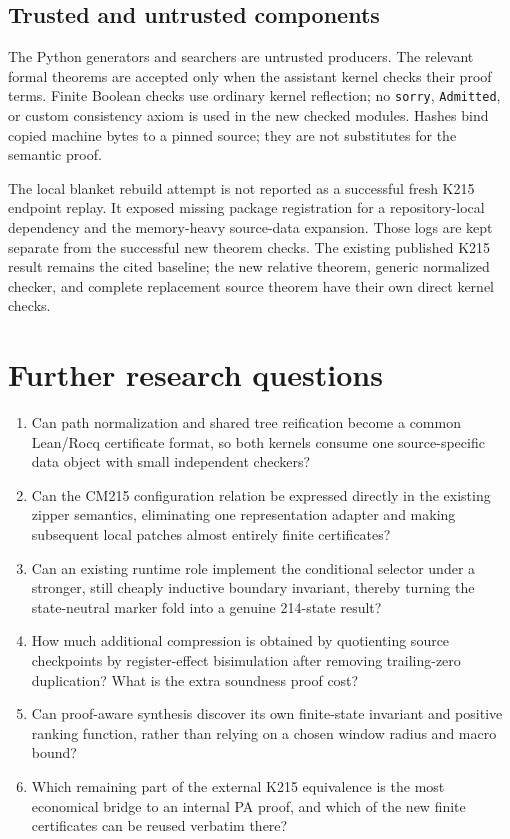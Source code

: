 \documentclass[11pt,letterpaper]{article}
\theoremstyle{definition}\newtheorem{definition}[theorem]{Definition}
\theoremstyle{remark}\newtheorem{remark}[theorem]{Remark}
\begin{document}
\subsection{Trusted and untrusted components}

The Python generators and searchers are untrusted producers. The relevant
formal theorems are accepted only when the assistant kernel checks their
proof terms. Finite Boolean checks use ordinary kernel reflection; no
\texttt{sorry}, \texttt{Admitted}, or custom consistency axiom is used in
the new checked modules. Hashes bind copied machine bytes to a pinned
source; they are not substitutes for the semantic proof.

The local blanket rebuild attempt is not reported as a successful fresh
K215 endpoint replay. It exposed missing package registration for a
repository-local dependency and the memory-heavy source-data expansion.
Those logs are kept separate from the successful new theorem checks. The
existing published K215 result remains the cited baseline; the new
relative theorem, generic normalized checker, and complete replacement
source theorem have their own direct kernel checks.

\section{Further research questions}

\begin{enumerate}
\item Can path normalization and shared tree reification become a common
Lean/Rocq certificate format, so both kernels consume one source-specific
data object with small independent checkers?
\item Can the CM215 configuration relation be expressed directly in the
existing zipper semantics, eliminating one representation adapter and
making subsequent local patches almost entirely finite certificates?
\item Can an existing runtime role implement the conditional selector
under a stronger, still cheaply inductive boundary invariant, thereby
turning the state-neutral marker fold into a genuine 214-state result?
\item How much additional compression is obtained by quotienting source
checkpoints by register-effect bisimulation after removing trailing-zero
duplication? What is the extra soundness proof cost?
\item Can proof-aware synthesis discover its own finite-state invariant
and positive ranking function, rather than relying on a chosen window
radius and macro bound?
\item Which remaining part of the external K215 equivalence is the most
economical bridge to an internal PA proof, and which of the new finite
certificates can be reused verbatim there?
\end{enumerate}
\end{document}
